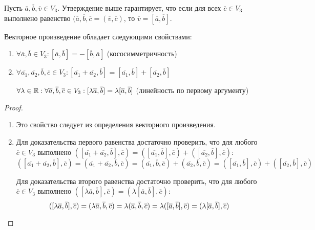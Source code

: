 \begin{note}
	Пусть $\overline a, \overline b, \overline{v} \in V_3$. Утверждение выше гарантирует, что если для всех $\overline{c} \in V_3$ выполнено равенство $(\overline{a}, \overline{b}, \overline{c} = (\overline{v}, \overline{c})$, то $ \overline{v} = [\overline{a}, \overline{b}]$.
\end{note}

\begin{theorem}
	Векторное произведение обладает следующими свойствами:
	\begin{enumerate}
		\item $\forall \overline a, \overline b \in V_3: [\overline{a}, \overline{b}] = -[\overline{b}, \overline{a}]$ (кососимметричность)
		\item $\forall \overline{a_1}, \overline{a_2}, \overline{b}, \overline{c} \in V_3: [\overline{a_1} + \overline{a_2}, \overline{b}] = [\overline{a_1}, \overline{b}] + [\overline{a_2}, \overline{b}]$
		
		$\forall \lambda \in \mathbb{R}: \forall \overline{a}, \overline{b}, \overline{c} \in V_3: [\lambda\overline{a}, \overline{b}] = \lambda[\overline{a}, \overline{b}]$ (линейность по первому аргументу)
	\end{enumerate}
\end{theorem}

\begin{proof}~
	\begin{enumerate}
		\item Это свойство следует из определения векторного произведения.
		\item Для доказательства первого равенства достаточно проверить, что для любого $\overline{c} \in V_3$ выполнено $([\overline{a_1} + \overline{a_2}, \overline{b}], \overline{c}) = ([\overline{a_1}, \overline{b}], \overline{c}) + ([\overline{a_2}, \overline{b}], \overline{c})$:
		\[
		([\overline{a_1} + \overline{a_2}, \overline{b}], \overline{c}) = (\overline{a_1} + \overline{a_2}, \overline{b}, \overline{c}) = (\overline{a_1}, \overline{b}, \overline{c}) + (\overline{a_2}, \overline{b}, \overline{c}) = ([\overline{a_1}, \overline{b}], \overline{c}) + ([\overline{a_2}, \overline{b}], \overline{c})
		\]
		
		Для доказательства второго равенства достаточно проверить, что для любого $\overline{c} \in V_3$ выполнено $([\lambda\overline{a}, \overline{b}], \overline{c}) = (\lambda[\overline{a}, \overline{b}], \overline{c})$:
		\[
		([\lambda\overline{a}, \overline{b}], \overline{c}) = (\lambda\overline{a}, \overline{b}, \overline{c}) = \lambda(\overline{a}, \overline{b}, \overline{c}) = \lambda([\overline{a}, \overline{b}], \overline{c}) = (\lambda[\overline{a}, \overline{b}], \overline{c})
		\qedhere
		\]
	\end{enumerate}
\end{proof}

